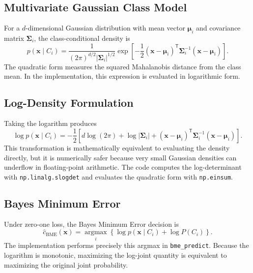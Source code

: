 \documentclass[11pt,a4paper]{article}
\newcommand{\code}[1]{\texttt{#1}}
\begin{document}
\subsection{Multivariate Gaussian Class Model}
For a $d$-dimensional Gaussian distribution with mean vector $\boldsymbol{\mu}_i$ and covariance matrix $\boldsymbol{\Sigma}_i$, the class-conditional density is
\begin{equation}
p(\mathbf{x}\mid C_i)
=
\frac{1}{(2\pi)^{d/2}|\boldsymbol{\Sigma}_i|^{1/2}}
\exp\!\left[
-\frac{1}{2}
(\mathbf{x}-\boldsymbol{\mu}_i)^{\mathsf T}
\boldsymbol{\Sigma}_i^{-1}
(\mathbf{x}-\boldsymbol{\mu}_i)
\right].
\end{equation}
The quadratic form measures the squared Mahalanobis distance from the class mean. In the implementation, this expression is evaluated in logarithmic form.

\subsection{Log-Density Formulation}
Taking the logarithm produces
\begin{equation}
\log p(\mathbf{x}\mid C_i)
=
-\frac{1}{2}
\left[
 d\log(2\pi)
+\log|\boldsymbol{\Sigma}_i|
+
(\mathbf{x}-\boldsymbol{\mu}_i)^{\mathsf T}
\boldsymbol{\Sigma}_i^{-1}
(\mathbf{x}-\boldsymbol{\mu}_i)
\right].
\end{equation}
This transformation is mathematically equivalent to evaluating the density directly, but it is numerically safer because very small Gaussian densities can underflow in floating-point arithmetic. The code computes the log-determinant with \code{np.linalg.slogdet} and evaluates the quadratic form with \code{np.einsum}.

\subsection{Bayes Minimum Error}
Under zero-one loss, the Bayes Minimum Error decision is
\begin{equation}
\widehat{c}_{\mathrm{BME}}(\mathbf{x})
=
\underset{i}{\operatorname{argmax}}
\left\{
\log p(\mathbf{x}\mid C_i)+\log P(C_i)
\right\}.
\end{equation}
The implementation performs precisely this argmax in \code{bme\_predict}. Because the logarithm is monotonic, maximizing the log-joint quantity is equivalent to maximizing the original joint probability.
\end{document}
